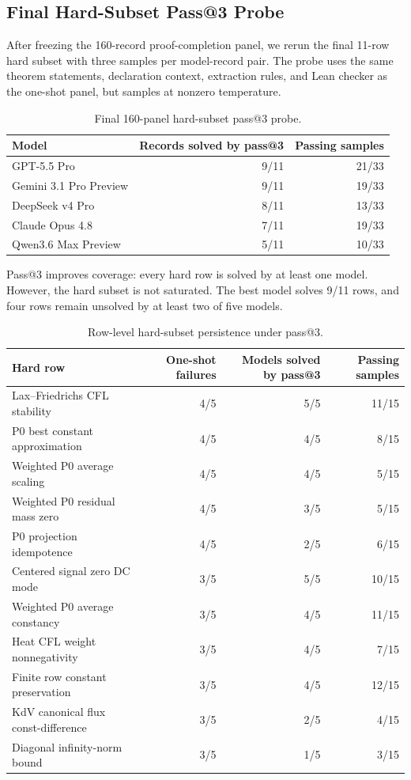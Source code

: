 \subsection{Final Hard-Subset Pass@3 Probe}

After freezing the 160-record proof-completion panel, we rerun the final
11-row hard subset with three samples per model-record pair. The probe uses the
same theorem statements, declaration context, extraction rules, and Lean
checker as the one-shot panel, but samples at nonzero temperature.

\begin{table}[htbp]
\centering
\caption{Final 160-panel hard-subset pass@3 probe.}
\label{tab:supp-pass3}
\begin{tabular}{lrr}
\toprule
Model & Records solved by pass@3 & Passing samples\\
\midrule
GPT-5.5 Pro & 9/11 & 21/33\\
Gemini 3.1 Pro Preview & 9/11 & 19/33\\
DeepSeek v4 Pro & 8/11 & 13/33\\
Claude Opus 4.8 & 7/11 & 19/33\\
Qwen3.6 Max Preview & 5/11 & 10/33\\
\bottomrule
\end{tabular}
\end{table}

Pass@3 improves coverage: every hard row is solved by at least one model.
However, the hard subset is not saturated. The best model solves 9/11 rows,
and four rows remain unsolved by at least two of five models.

\begin{table}[htbp]
\centering
\caption{Row-level hard-subset persistence under pass@3.}
\label{tab:supp-hard-subset-rows}
\small
\begin{tabularx}{\linewidth}{Xrrr}
\toprule
Hard row & One-shot failures & Models solved by pass@3 & Passing samples\\
\midrule
Lax--Friedrichs CFL stability & 4/5 & 5/5 & 11/15\\
P0 best constant approximation & 4/5 & 4/5 & 8/15\\
Weighted P0 average scaling & 4/5 & 4/5 & 5/15\\
Weighted P0 residual mass zero & 4/5 & 3/5 & 5/15\\
P0 projection idempotence & 4/5 & 2/5 & 6/15\\
Centered signal zero DC mode & 3/5 & 5/5 & 10/15\\
Weighted P0 average constancy & 3/5 & 4/5 & 11/15\\
Heat CFL weight nonnegativity & 3/5 & 4/5 & 7/15\\
Finite row constant preservation & 3/5 & 4/5 & 12/15\\
KdV canonical flux const-difference & 3/5 & 2/5 & 4/15\\
Diagonal infinity-norm bound & 3/5 & 1/5 & 3/15\\
\bottomrule
\end{tabularx}
\end{table}

